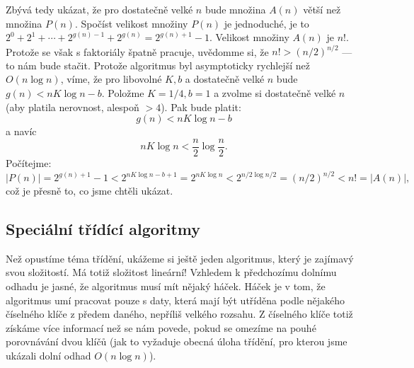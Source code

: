 Zbývá tedy ukázat, že pro dostatečně velké $n$ bude množina $A(n)$ větší než množina $P(n)$. Spočíst velikost množiny $P(n)$ je jednoduché, je to
$2^0 + 2^1 + \cdots + 2^{g(n)-1} + 2^{g(n)} = 2^{g(n)+1}-1$. Velikost množiny $A(n)$ je $n!$. Protože se však s faktoriály špatně pracuje, uvědomme si, že 
$n!>(n/2)^{n/2}$ --- to nám bude stačit. Protože algoritmus byl asymptoticky rychlejší než $O(n\log n)$, víme, že pro libovolné $K, b$ a dostatečně velké $n$ bude $g(n)< nK\log n -b$.
Položme $K=1/4, b=1$ a zvolme si dostatečně velké $n$ (aby platila nerovnost, alespoň $>4$). Pak bude platit:
\begin{displaymath}
 g(n)< nK\log n-b
\end{displaymath}
a navíc
\begin{displaymath}
 nK\log n < \frac{n}{2}\log \frac{n}{2}.
\end{displaymath}
Počítejme: 
\begin{displaymath}
|P(n)| = 2^{g(n)+1}-1 < 2^{nK\log n - b +1} = 2^{nK\log n} < 2^{n/2\log n/2} = (n/2)^{n/2} < n! = |A(n)|,
\end{displaymath}
což je přesně to, co jsme chtěli ukázat.

\subsection*{Speciální třídící algoritmy}
Než opustíme téma třídění, ukážeme si ještě jeden algoritmus, který je zajímavý
svou složitostí. Má totiž složitost lineární! Vzhledem k předchozímu dolnímu odhadu je jasné, že algoritmus musí mít nějaký háček.
Háček je v tom, že algoritmus umí pracovat pouze s daty, která mají být utříděna 
podle nějakého číselného klíče z předem daného, nepříliš velkého rozsahu. 
Z číselného klíče totiž získáme více informací než se nám povede, pokud se omezíme na pouhé porovnávání dvou klíčů (jak to vyžaduje obecná úloha třídění, pro kterou jsme ukázali dolní odhad $O(n\log n)$).

